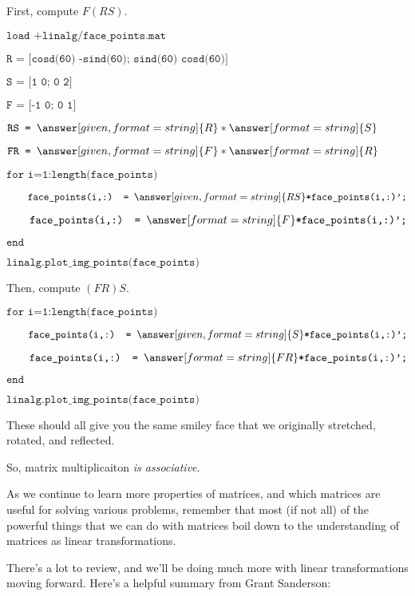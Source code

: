 \documentclass{ximera}
\begin{document}
\begin{exploration}
\begin{example}
        First, compute $F(RS)$.

        \vspace{1cm}


$\texttt{load +linalg/face\_points.mat}$

$\texttt{R = [cosd(60) -sind(60); sind(60) cosd(60)]}$

$\texttt{S = [1 0; 0 2]}$

$\texttt{F = [-1 0; 0 1]}$

$\texttt{RS = }\answer[given,format=string]{R}*\answer[format=string]{S}$

$\texttt{FR = }\answer[given,format=string]{F}*\answer[format=string]{R}$

$\texttt{for i=1:length(face\_points)}$

$\qquad \texttt{face\_points(i,:) = }\answer[given,format=string]{RS}\texttt{*face\_points(i,:)';}$

$\qquad \texttt{face\_points(i,:) = }\answer[format=string]{F}\texttt{*face\_points(i,:)';}$

$\texttt{end}$

$\texttt{linalg.plot\_img\_points(face\_points)}$

\vspace{1cm}

        Then, compute $(FR)S$.

        \vspace{1cm}

$\texttt{for i=1:length(face\_points)}$

$\qquad \texttt{face\_points(i,:) = }\answer[given,format=string]{S}\texttt{*face\_points(i,:)';}$

$\qquad \texttt{face\_points(i,:) = }\answer[format=string]{FR}\texttt{*face\_points(i,:)';}$

$\texttt{end}$

$\texttt{linalg.plot\_img\_points(face\_points)}$

\vspace{1cm}

These should all give you the same smiley face that we originally stretched, rotated, and reflected.

So, matrix multiplicaiton \emph{is associative}.

    \end{example}

\end{exploration}

\begin{remark}

    As we continue to learn more properties of matrices, and which matrices are useful for solving various problems, remember that most (if not all) of the powerful things that we can do with matrices boil down to the understanding of matrices as linear transformations.

\end{remark}

There's a lot to review, and we'll be doing much more with linear transformations moving forward. Here's a helpful summary from Grant Sanderson:

\end{document}
